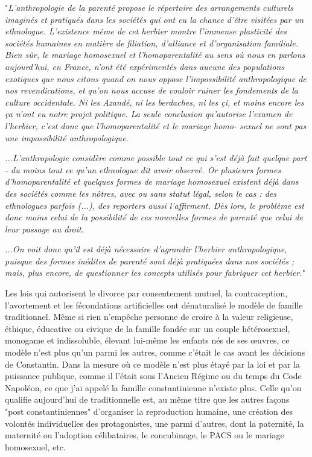   \begin{displayquote}
  "\emph{L'anthropologie  de  la  parenté  propose  le  répertoire
des arrangements culturels imaginés et pratiqués dans
les sociétés qui ont eu la chance d'être visitées par un
ethnologue. L'existence  même  de  cet  herbier  montre
l'immense  plasticité  des  sociétés  humaines  en  matière
de filiation, d'alliance et d'organisation familiale. Bien sûr,
le mariage homosexuel et l'homoparentalité au sens où
nous en parlons aujourd'hui, en France, n'ont été expérimentés  dans  aucune  des  populations  exotiques  que
nous  citons  quand  on  nous  oppose  l'impossibilité
anthropologique de nos revendications, et qu'on nous
accuse  de  vouloir  ruiner  les  fondements  de  la  culture
occidentale. Ni les Azandé, ni les berdaches, ni les çi, et
moins encore les ça n'ont eu notre projet politique.
La  seule  conclusion  qu'autorise  l'examen  de  l'herbier,
c'est donc que l'homoparentalité et le mariage homo-
sexuel  ne  sont  pas  une  impossibilité  anthropologique.}

\emph{...L'anthropologie  considère comme possible tout ce qui s'est déjà fait quelque part - du moins tout ce qu'un ethnologue dit avoir observé. Or  plusieurs  formes  d'homoparentalité  et  quelques
formes de mariage homosexuel existent déjà dans des
sociétés  comme  les  nôtres, avec  ou  sans  statut  légal,
selon  le  cas  : des  ethnologues  parfois (...), des
reporters  aussi  l'affirment. Dès  lors, le  problème  est
donc  moins  celui  de  la  possibilité  de  ces  nouvelles
formes de parenté que celui de leur passage au droit.}

\emph{...On voit donc qu'il est déjà nécessaire d'agrandir l'herbier  anthropologique, puisque  des  formes  inédites  de
parenté  sont  déjà  pratiquées  dans  nos  sociétés ; mais,
plus  encore, de questionner  les  concepts  utilisés  pour
fabriquer cet herbier.}" 
 \end{displayquote}
 




Les lois qui autorisent le divorce par consentement mutuel, la contraception, l'avortement et les fécondations artificielles ont dénaturalisé le modèle de famille traditionnel. Même si rien n'empêche personne de croire à la valeur religieuse, éthique, éducative ou civique de la famille fondée sur un couple hétérosexuel, monogame et indissoluble, élevant lui-même les enfants nés de ses œuvres, ce modèle n'est plus qu'un parmi les autres, comme c'était le cas avant les décisions de Constantin. Dans la mesure où ce modèle n'est plus étayé par la loi et par la puissance publique, comme il l'était sous l'Ancien Régime ou du temps du Code Napoléon, ce que j'ai appelé la famille constantinienne n'existe plus. Celle qu'on qualifie aujourd'hui de traditionnelle est, au même titre que les autres façons "post constantiniennes" d'organiser la reproduction humaine, une création des volontés individuelles des protagonistes, une parmi d'autres, dont la paternité, la maternité ou l'adoption célibataires, le concubinage, le PACS ou le mariage homosexuel, etc.

